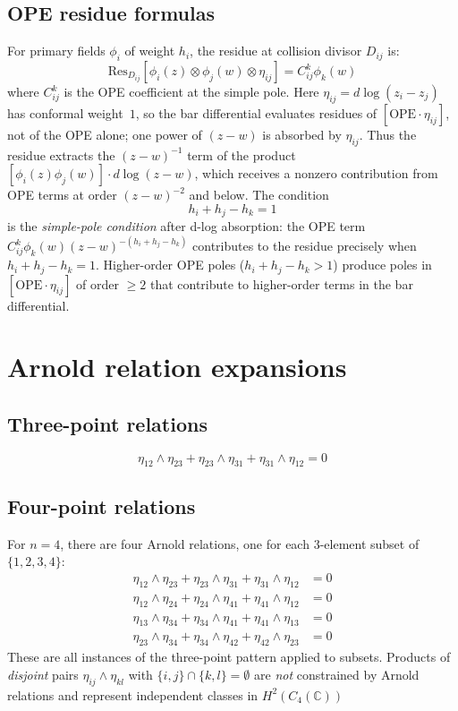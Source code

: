 \subsection{OPE residue formulas}

For primary fields $\phi_i$ of weight $h_i$, the residue at collision divisor $D_{ij}$ is:
\[\text{Res}_{D_{ij}}[\phi_i(z) \otimes \phi_j(w) \otimes \eta_{ij}] = C^k_{ij} \phi_k(w)\]
where $C^k_{ij}$ is the OPE coefficient at the simple pole. Here $\eta_{ij} = d\log(z_i - z_j)$ has conformal weight~$1$, so the bar differential evaluates residues of $[\text{OPE} \cdot \eta_{ij}]$, not of the OPE alone; one power of $(z-w)$ is absorbed by $\eta_{ij}$. Thus the residue extracts the $(z-w)^{-1}$ term of the product $[\phi_i(z)\phi_j(w)] \cdot d\log(z-w)$, which receives a nonzero contribution from OPE terms at order $(z-w)^{-2}$ and below. The condition
\[h_i + h_j - h_k = 1\]
is the \emph{simple-pole condition} after d-log absorption: the OPE term $C^k_{ij}\phi_k(w)(z-w)^{-(h_i+h_j-h_k)}$ contributes to the residue precisely when $h_i + h_j - h_k = 1$. Higher-order OPE poles ($h_i + h_j - h_k > 1$) produce poles in $[\text{OPE}\cdot\eta_{ij}]$ of order $\geq 2$ that contribute to higher-order terms in the bar differential.

\section{Arnold relation expansions}

\subsection{Three-point relations}

\[\eta_{12} \wedge \eta_{23} + \eta_{23} \wedge \eta_{31} + \eta_{31} \wedge \eta_{12} = 0\]

\subsection{Four-point relations}

For $n = 4$, there are four Arnold relations, one for each $3$-element subset of
$\{1,2,3,4\}$:
\begin{align}
\eta_{12} \wedge \eta_{23} + \eta_{23} \wedge \eta_{31} + \eta_{31} \wedge \eta_{12} &= 0 \\
\eta_{12} \wedge \eta_{24} + \eta_{24} \wedge \eta_{41} + \eta_{41} \wedge \eta_{12} &= 0 \\
\eta_{13} \wedge \eta_{34} + \eta_{34} \wedge \eta_{41} + \eta_{41} \wedge \eta_{13} &= 0 \\
\eta_{23} \wedge \eta_{34} + \eta_{34} \wedge \eta_{42} + \eta_{42} \wedge \eta_{23} &= 0
\end{align}
These are all instances of the three-point pattern applied to subsets.
Products of \emph{disjoint} pairs $\eta_{ij} \wedge \eta_{kl}$ with
$\{i,j\} \cap \{k,l\} = \emptyset$ are \emph{not} constrained by Arnold relations
and represent independent classes in $H^2(C_4(\mathbb{C}))$

